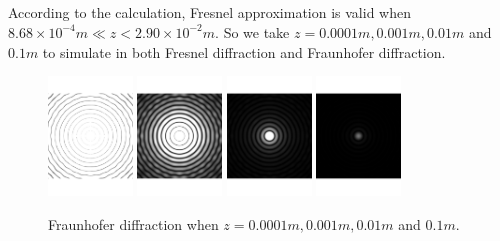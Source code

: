 \documentclass[fontsize=11pt]{scrartcl}
\begin{document}
\subsection{}
According to the calculation, Fresnel approximation is valid when 
$8.68 \times 10^{-4}m \ll z < 2.90 \times 10^{-2}m $. So we take 
$z = 0.0001m, 0.001m, 0.01m$ and $0.1m$ to simulate in both Fresnel diffraction
and Fraunhofer diffraction.
\begin{figure}[H]
    \centering
     \includegraphics[width=0.20\textwidth]{img/1_Fra_-4.bmp.pdf}
     \includegraphics[width=0.20\textwidth]{img/1_Fra_-3.bmp.pdf}
     \includegraphics[width=0.20\textwidth]{img/1_Fra_-2.bmp.pdf}
     \includegraphics[width=0.20\textwidth]{img/1_Fra_-1.bmp.pdf}
     \caption{Fraunhofer diffraction when $z = 0.0001m, 0.001m, 0.01m$ and $0.1m$.}
     \label{fig1.2}
\end{figure}
\end{document}
